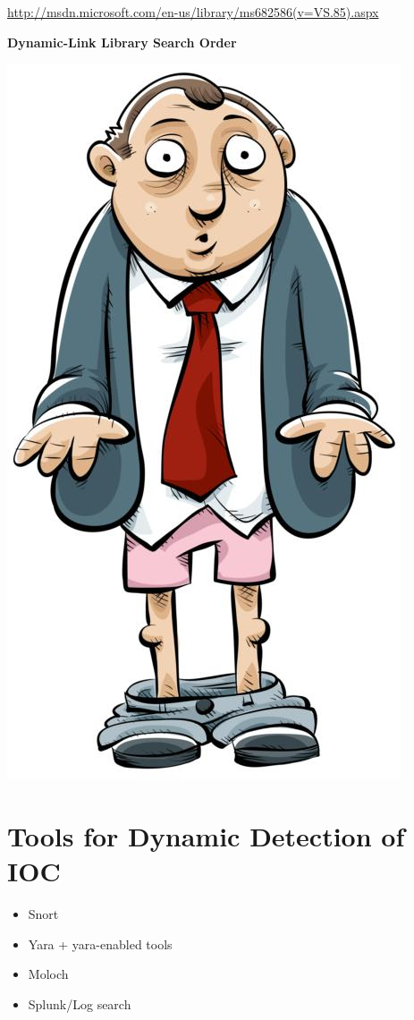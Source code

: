 \documentclass[11pt]{article}
\begin{document}
\url{http://msdn.microsoft.com/en-us/library/ms682586(v=VS.85).aspx}

\textbf{Dynamic-Link Library Search Order}

\includegraphics[width=.9\linewidth]{images/pantsdown.jpg}



\section*{Tools for Dynamic Detection of IOC}
\label{sec-15}

\begin{itemize}
\item Snort
\item Yara + yara-enabled tools
\item Moloch
\item Splunk/Log search
\end{itemize}
\end{document}
